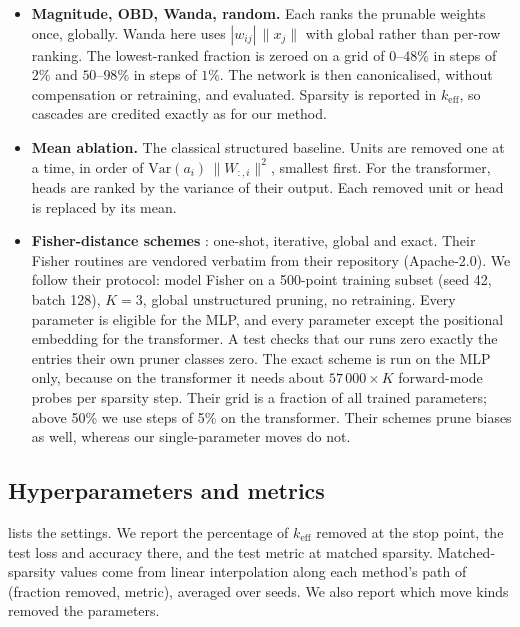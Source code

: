 \documentclass[11pt,a4paper]{article}
\theoremstyle{definition}
\newcommand{\keff}{k_{\mathrm{eff}}}
\begin{document}
\begin{itemize}
\item \textbf{Magnitude, OBD, Wanda, random.} Each ranks the prunable weights once,
globally. Wanda here uses $|w_{ij}|\,\|x_j\|$ with global rather than per-row ranking.
The lowest-ranked fraction is zeroed on a grid of $0$--$48\%$ in steps of $2\%$ and
$50$--$98\%$ in steps of $1\%$. The network is then canonicalised, without compensation
or retraining, and evaluated. Sparsity is reported in $\keff$, so cascades are credited
exactly as for our method.
\item \textbf{Mean ablation.} The classical structured baseline. Units are removed one at
a time, in order of $\mathrm{Var}(a_i)\,\|W_{:,i}\|^2$, smallest first. For the
transformer, heads are ranked by the variance of their output. Each removed unit or head
is replaced by its mean.
\item \textbf{Fisher-distance schemes} \citep{berman2026fdist}: one-shot, iterative,
global and exact. Their Fisher routines are vendored verbatim from their repository
(Apache-2.0). We follow their protocol: model Fisher on a 500-point training subset
(seed 42, batch 128), $K=3$, global unstructured pruning, no retraining. Every
parameter is eligible for the MLP, and every parameter except the positional embedding
for the transformer. A test checks that our runs zero exactly the entries their own
pruner classes zero. The exact scheme is run on the MLP only, because on the transformer
it needs about $57\,000\times K$ forward-mode probes per sparsity step. Their grid is a
fraction of all trained parameters; above 50\% we use steps of 5\% on the transformer.
Their schemes prune biases as well, whereas our single-parameter moves do not.
\end{itemize}

\subsection{Hyperparameters and metrics}
\label{sec:hyper}

 lists the settings. We report the percentage of $\keff$ removed at
the stop point, the test loss and accuracy there, and the test metric at matched
sparsity. Matched-sparsity values come from linear interpolation along each method's
path of (fraction removed, metric), averaged over seeds. We also report which move kinds
removed the parameters.
\end{document}
